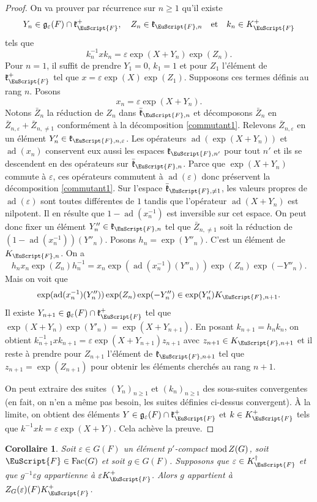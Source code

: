 \documentclass[JEP,XML,SOM,Unicode,francais]{cedram}
\let\mathcal \EuScript
\let\epsilon\varepsilon
\newcommand{\quadet}{\quad\text{et}\quad}
\newcommand{\rmod}{\textup{mod}\,}
\newcommand{\frg}{\mathfrak{g}}
\newcommand{\frk}{\mathfrak{k}}
\newcommand{\Fac}{\mathrm{Fac}}
\DeclareMathOperator{\ad}{ad}
\newcommand{\cF}{\mathcal{F}}
\theoremstyle{plain}
\newtheorem*{cor*}{Corollaire}
\theoremstyle{definition}
\begin{document}
\begin{proof}
On va prouver par récurrence sur $n\geq1$ qu'il existe
\[
Y_{n}\in \frg_{\epsilon}(F)\cap \frk_{\cF}^+,\quad Z_{n}\in \frk_{\cF,n}\quadet k_{n}\in K_{\cF}^+
\]
tels que
\[
k_{n}^{-1}xk_{n}=\epsilon \exp(X+Y_{n})\exp(Z_{n}).
\]
Pour $n=1$, il suffit de prendre $Y_{1}=0$, $k_{1}=1$ et pour $Z_{1}$ l'élément de $\frk_{\cF}^+$ tel que $x=\epsilon \exp(X)\exp(Z_{1})$. Supposons ces termes définis au rang $n$. Posons
\[
x_{n}=\epsilon \exp(X+Y_{n}).
\]
Notons $\bar{Z}_{n}$ la réduction de $Z_{n}$ dans $\bar{\frk}_{\cF,n}$ et décomposons $\bar{Z}_{n}$ en $\bar{Z}_{n,\epsilon}+\bar{Z}_{n,\neq1}$ conformément à la décomposition \eqref{commutant1}. Relevons $\bar{Z}_{n,\epsilon}$ en un élément $Y'_{n}\in \frk_{\cF,n,\epsilon}$. Les opérateurs $\ad(\exp(X+Y_{n}))$ et $\ad(x_{n})$ conservent eux aussi les espaces $\frk_{\cF,n'}$ pour tout $n'$ et ils se descendent en des opérateurs sur $\bar{\frk}_{\cF,n}$. Parce que $\exp(X+Y_{n})$ commute à $\epsilon$, ces opérateurs commutent à $\ad(\epsilon)$ donc préservent la décomposition \eqref{commutant1}. Sur l'espace $\bar{\frk}_{\cF,\neq1}$, les valeurs propres de $\ad(\epsilon)$ sont toutes différentes de $1$ tandis que l'opérateur $\ad(X+Y_{n})$ est nilpotent. Il en résulte que $1-\ad(x_{n}^{-1})$ est inversible sur cet espace. On peut donc fixer un élément $Y''_{n}\in \frk_{\cF,n}$ tel que $\bar{Z}_{n,\neq1}$ soit la réduction de $(1-\ad(x_{n}^{-1}))(Y''_{n})$. Posons $h_{n}=\exp(Y''_{n})$. C'est un élément de $K_{\cF,n}$. On a
\[
h_{n}x_{n}\exp(Z_{n})h_{n}^{-1}=x_{n}\exp(\ad(x_{n}^{-1})(Y''_{n}))\exp(Z_{n})\exp(-Y''_{n}).
\]
Mais on voit que
\[
\exp(\ad(x_{n}^{-1})(Y''_{n}))\exp(Z_{n})\exp(-Y''_{n})\in \exp(Y'_{n})K_{\cF,n+1}.
\]
Il existe $Y_{n+1}\in \frg_{\epsilon}(F)\cap \frk_{\cF}^+ $ tel que $\exp(X+Y_{n})\exp(Y'_{n})=\exp(X+Y_{n+1})$. En posant $k_{n+1}=h_{n}k_{n}$, on obtient
$k_{n+1}^{-1}xk_{n+1}=\epsilon \exp(X+Y_{n+1})z_{n+1}$ avec $z_{n+1}\in K_{\cF,n+1}$ et il reste à prendre pour $Z_{n+1}$ l'élément de $\frk_{\cF,n+1}$ tel que $z_{n+1}=\exp(Z_{n+1})$ pour obtenir les éléments cherchés au rang $n+1$.

On peut extraire des suites $(Y_{n})_{n\geq1}$ et $(k_{n})_{n\geq1}$ des sous-suites convergentes (en fait, on n'en a même pas besoin, les suites définies ci-dessus convergent). À la limite, on obtient des éléments $Y\in \frg_{\epsilon}(F)\cap \frk_{\cF}^+$ et $k\in K_{\cF}^+$ tels que $k^{-1}xk=\epsilon \exp(X+Y)$. Cela achève la preuve.
\end{proof}

\label{corollaire}
\begin{cor*}
Soit $\epsilon\in G(F)$ un élément $p'$-compact $\rmod Z(G)$, soit $\cF\in \Fac(G)$ et soit $g\in G(F)$. Supposons que $\epsilon\in K_{\cF}^{\dag}$ et que $g^{-1}\epsilon g$ appartienne à $\epsilon K_{\cF}^+$. Alors $g$ appartient à $Z_{G}(\epsilon)(F)K_{\cF}^+$.
\end{cor*}
\end{document}
